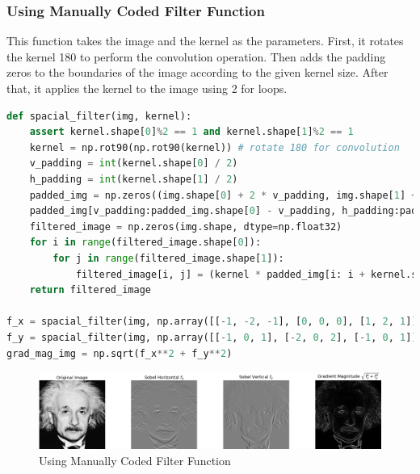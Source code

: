 \documentclass[a4paper]{article}
\begin{document}
\subsubsection*{Using Manually Coded Filter Function}
This function takes the image and the kernel as the parameters.
 First, it rotates the kernel 180 to perform the convolution operation.
  Then adds the padding zeros to the boundaries of the image according
   to the given kernel size. After that, it applies the kernel to the
    image using 2 for loops.
\begin{lstlisting}[language=python]
def spacial_filter(img, kernel):
    assert kernel.shape[0]%2 == 1 and kernel.shape[1]%2 == 1
    kernel = np.rot90(np.rot90(kernel)) # rotate 180 for convolution
    v_padding = int(kernel.shape[0] / 2)
    h_padding = int(kernel.shape[1] / 2)
    padded_img = np.zeros((img.shape[0] + 2 * v_padding, img.shape[1] + 2 * h_padding ), dtype=np.float32)
    padded_img[v_padding:padded_img.shape[0] - v_padding, h_padding:padded_img.shape[1] - h_padding] = img
    filtered_image = np.zeros(img.shape, dtype=np.float32)
    for i in range(filtered_image.shape[0]):
        for j in range(filtered_image.shape[1]):
            filtered_image[i, j] = (kernel * padded_img[i: i + kernel.shape[0], j: j + kernel.shape[1]]).sum()
    return filtered_image

f_x = spacial_filter(img, np.array([[-1, -2, -1], [0, 0, 0], [1, 2, 1]], dtype=np.float32))
f_y = spacial_filter(img, np.array([[-1, 0, 1], [-2, 0, 2], [-1, 0, 1]], dtype=np.float32))
grad_mag_img = np.sqrt(f_x**2 + f_y**2)
\end{lstlisting}
\begin{figure}[!htb]
    \centering
    \includegraphics[width=\textwidth]{../q62.png}
    \caption{Using Manually Coded Filter Function}
    \label{figq62}
\end{figure}
\end{document}
